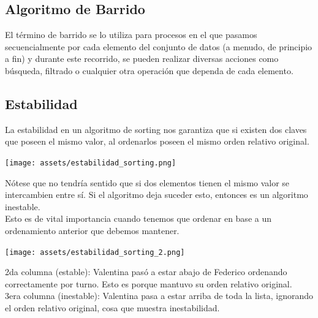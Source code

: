 \documentclass[10pt,a4paper]{article}
\begin{document}
\subsection*{Algoritmo de Barrido}
El término de barrido se lo utiliza para procesos en el que pasamos secuencialmente por cada elemento del conjunto de datos (a menudo, de principio a fin) y durante este recorrido, se pueden realizar diversas acciones como búsqueda, filtrado o cualquier otra operación que dependa de cada elemento. 
\subsection*{Estabilidad}
La estabilidad en un algoritmo de sorting nos garantiza que si existen dos claves que poseen el mismo valor, al ordenarlos poseen el mismo orden relativo original. 
\begin{center}
    \begin{minipage}[b]{0.5\textwidth}
        \texttt{[image: assets/estabilidad\_sorting.png]}
        \centering
        \label{fig:estabilidad_sorting}
    \end{minipage}
\end{center}
Nótese que no tendría sentido que si dos elementos tienen el mismo valor se intercambien entre sí. Si el algoritmo deja suceder esto, entonces es un algoritmo inestable. \\
Esto es de vital importancia cuando tenemos que ordenar en base a un ordenamiento anterior que debemos mantener.
\begin{center}
    \begin{minipage}[b]{0.5\textwidth}
        \texttt{[image: assets/estabilidad\_sorting\_2.png]}
        \centering
        \label{fig:estabilidad_sorting_2}
    \end{minipage}
\end{center}
2da columna (estable): Valentina pasó a estar abajo de Federico ordenando correctamente por turno. Esto es porque mantuvo su orden relativo original. \\ 
3era columna (inestable): Valentina pasa a estar arriba de toda la lista, ignorando el orden relativo original, cosa que muestra inestabilidad.
\end{document}
